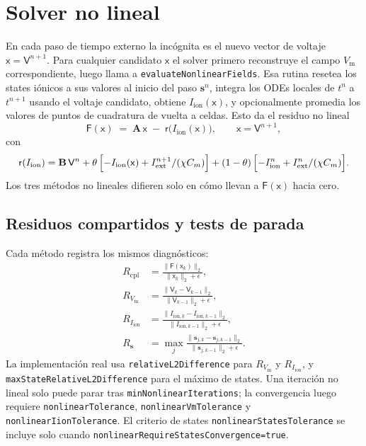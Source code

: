 \documentclass[11pt,a4paper]{article}
\newcommand{\code}[1]{\texttt{\small #1}}
\newcommand{\Vm}{V_{\text{m}}}
\newcommand{\Iion}{I_{\mathrm{ion}}}
\newcommand{\Aimp}{\mathbf{A}}
\newcommand{\Bimp}{\mathbf{B}}
\newcommand{\Fres}{\mathsf{F}}
\newcommand{\Iext}{I_{\mathrm{ext}}}
\begin{document}
\section{Solver no lineal}

En cada paso de tiempo externo la incógnita es el nuevo vector de voltaje
$\mathsf{x}=\mathsf{V}^{n+1}$. Para cualquier candidato $\mathsf{x}$ el solver
primero reconstruye el campo $\Vm$ correspondiente, luego llama a
\code{evaluateNonlinearFields}. Esa rutina resetea los states iónicos a sus valores
al inicio del paso $\mathbf{s}^{n}$, integra los ODEs locales de $t^n$ a $t^{n+1}$
usando el voltaje candidato, obtiene $\Iion(\mathsf{x})$, y opcionalmente promedia
los valores de puntos de cuadratura de vuelta a celdas. Esto da el residuo no lineal
\begin{equation}
  \Fres(\mathsf{x})
   \;=\;
   \Aimp\, \mathsf{x}
   \;-\;
   \mathsf{r}\!\bigl( \Iion(\mathsf{x}) \bigr),
   \qquad
   \mathsf{x} = \mathsf{V}^{n+1},
   \label{eq:Fdef}
\end{equation}
con
\begin{equation}
  \mathsf{r}(\Iion)
  =
  \Bimp\,\mathsf{V}^{n}
  + \theta\,\Bigl[-\Iion(\mathsf{x})+\Iext^{n+1}/(\chi C_m)\Bigr]
  + (1-\theta)\,\Bigl[-\Iion^{n}+\Iext^{n}/(\chi C_m)\Bigr].
  \label{eq:rhsIion}
\end{equation}
Los tres métodos no lineales difieren solo en cómo llevan a
$\Fres(\mathsf{x})$ hacia cero.

\subsection{Residuos compartidos y tests de parada}

Cada método registra los mismos diagnósticos:
\begin{align}
  R_{\mathrm{cpl}} &=
    \frac{\|\Fres(\mathsf{x}_{k})\|_2}
         {\|\mathsf{x}_{k}\|_2+\epsilon},\\
  R_{\Vm} &=
    \frac{\|\mathsf{V}_{k}-\mathsf{V}_{k-1}\|_2}
         {\|\mathsf{V}_{k-1}\|_2+\epsilon},\\
  R_{\Iion} &=
    \frac{\|I_{\mathrm{ion},k}-I_{\mathrm{ion},k-1}\|_2}
         {\|I_{\mathrm{ion},k-1}\|_2+\epsilon},\\
  R_{\mathbf{s}} &=
    \max_j
    \frac{\|\mathbf{s}_{j,k}-\mathbf{s}_{j,k-1}\|_2}
         {\|\mathbf{s}_{j,k-1}\|_2+\epsilon}.
\end{align}
La implementación real usa \code{relativeL2Difference} para $R_{\Vm}$ y $R_{\Iion}$,
y \code{maxStateRelativeL2Difference} para el máximo de states. Una iteración no
lineal solo puede parar tras \code{minNonlinearIterations}; la convergencia luego
requiere \code{nonlinearTolerance}, \code{nonlinearVmTolerance} y
\code{nonlinearIionTolerance}. El criterio de states
\code{nonlinearStatesTolerance} se incluye solo cuando
\code{nonlinearRequireStatesConvergence=true}.
\end{document}
